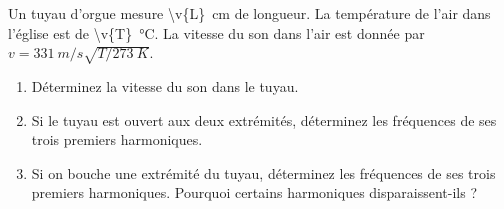 Un tuyau d'orgue mesure \qty{\v{L}}{cm} de longueur. La température de l'air dans l'église est de \qty{\v{T}}{\degreeCelsius}. La vitesse du son dans l'air est donnée par $v = \qty{331}{m/s}\sqrt{T/\qty{273}{K}}$.

\begin{enumerate}[label=\alph*)]
    \item Déterminez la vitesse du son dans le tuyau.
    \item Si le tuyau est ouvert aux deux extrémités, déterminez les fréquences de ses trois premiers harmoniques.
    \item Si on bouche une extrémité du tuyau, déterminez les fréquences de ses trois premiers harmoniques. Pourquoi certains harmoniques disparaissent-ils ?
\end{enumerate}
